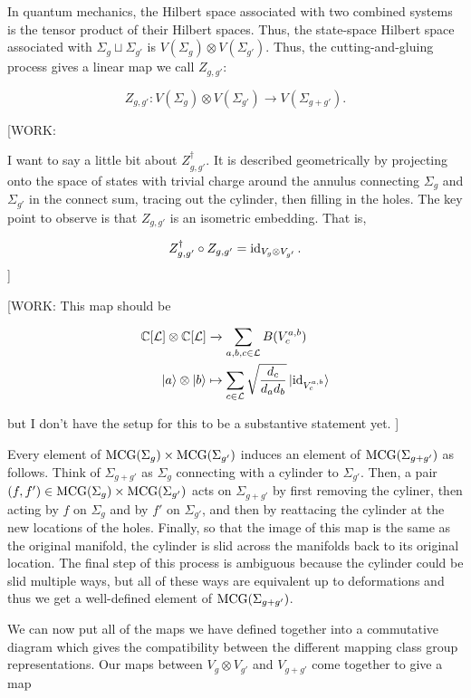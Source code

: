 In quantum mechanics, the Hilbert space associated with two combined systems is the tensor product of their Hilbert spaces. Thus, the state-space Hilbert space associated with $\Sigma_{g}\sqcup\Sigma_{g'}$ is $V(\Sigma_{g})\otimes V(\Sigma_{g'})$. Thus, the cutting-and-gluing process gives a linear map we call $Z_{g,g'}$:

$$Z_{g,g'}:V(\Sigma_{g})\otimes V(\Sigma_{g'})\xrightarrow{} V(\Sigma_{g+g'}).$$

[WORK:

I want to say a little bit about $Z_{g,g'}^\dagger$. It is described geometrically by projecting onto the space of states with trivial charge around the annulus connecting $\Sigma_{g}$ and $\Sigma_{g'}$ in the connect sum, tracing out the cylinder, then filling in the holes. The key point to observe is that $Z_{g,g'}$ is an isometric embedding. That is,

$$Z_{g,g'}^\dagger \circ Z_{g,g'}=\operatorname{id}_{V_{g}\otimes V_{g'}}.$$
]


[WORK: This map should be

\begin{align*}
\mathbb{C}[\mathcal{L}]\otimes \mathbb{C}[\mathcal{L}]&\xrightarrow{}\sum_{a,b,c\in \mathcal{L}}B(V^{a,b}_c)\\
\ket{a}\otimes \ket{b}&\mapsto \sum_{c\in \mathcal{L}}\sqrt{\frac{d_c}{d_ad_b}}\ket{\operatorname{id}_{V^{a,b}_c}}
\end{align*}

but I don't have the setup for this to be a substantive statement yet.
]

Every element of $\operatorname{MCG}(\Sigma_g)\times \operatorname{MCG}(\Sigma_{g'})$ induces an element of $\operatorname{MCG}(\Sigma_{g+g'})$ as follows. Think of $\Sigma_{g+g'}$ as $\Sigma_{g}$ connecting with a cylinder to $\Sigma_{g'}$. Then, a pair $(f,f')\in \operatorname{MCG}(\Sigma_g)\times \operatorname{MCG}(\Sigma_{g'})$ acts on $\Sigma_{g+g'}$ by first removing the cyliner, then acting by $f$ on $\Sigma_{g}$ and by $f'$ on $\Sigma_{g'}$, and then by reattacing the cylinder at the new locations of the holes. Finally, so that the image of this map is the same as the original manifold, the cylinder is slid across the manifolds back to its original location. The final step of this process is ambiguous because the cylinder could be slid multiple ways, but all of these ways are equivalent up to deformations and thus we get a well-defined element of $\operatorname{MCG}(\Sigma_{g+g'})$.

We can now put all of the maps we have defined together into a commutative diagram which gives the compatibility between the different mapping class group representations. Our maps between $V_{g}\otimes V_{g'}$ and $V_{g+g'}$ come together to give a map

